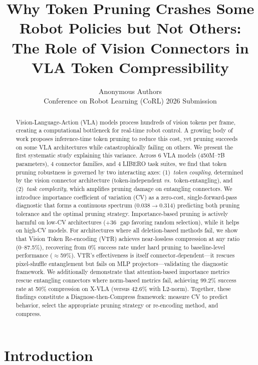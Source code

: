 \documentclass[10pt,letterpaper]{article}
\title{Why Token Pruning Crashes Some Robot Policies but Not Others:\\The Role of Vision Connectors in VLA Token Compressibility}
\author{
Anonymous Authors\\
Conference on Robot Learning (CoRL) 2026 Submission
}
\date{}
\newcommand{\pp}{\,\text{pp}}
\newcommand{\vs}{\textit{vs.}}
\begin{document}
\maketitle

\begin{abstract}
Vision-Language-Action (VLA) models process hundreds of vision tokens per frame, creating a computational bottleneck for real-time robot control. A growing body of work proposes inference-time token pruning to reduce this cost, yet pruning succeeds on some VLA architectures while catastrophically failing on others. We present the first systematic study explaining this variance. Across 6 VLA models (450M--7B parameters), 4 connector families, and 4 LIBERO task suites, we find that token pruning robustness is governed by two interacting axes: (1)~\emph{token coupling}, determined by the vision connector architecture (token-independent \vs\ token-entangling), and (2)~\emph{task complexity}, which amplifies pruning damage on entangling connectors. We introduce importance coefficient of variation (CV) as a zero-cost, single-forward-pass diagnostic that forms a continuous spectrum (0.038$\to$0.314) predicting both pruning tolerance and the optimal pruning strategy. Importance-based pruning is actively harmful on low-CV architectures ($+$36\pp\ gap favoring random selection), while it helps on high-CV models. For architectures where all deletion-based methods fail, we show that Vision Token Re-encoding (VTR) achieves near-lossless compression at any ratio (0--87.5\%), recovering from 0\% success rate under hard pruning to baseline-level performance ($\approx$59\%). VTR's effectiveness is itself connector-dependent---it rescues pixel-shuffle entanglement but fails on MLP projectors---validating the diagnostic framework. We additionally demonstrate that attention-based importance metrics rescue entangling connectors where norm-based metrics fail, achieving 99.2\% success rate at 50\% compression on X-VLA (versus 42.6\% with L2-norm). Together, these findings constitute a Diagnose-then-Compress framework: measure CV to predict behavior, select the appropriate pruning strategy or re-encoding method, and compress.
\end{abstract}

\section{Introduction}
\label{sec:intro}
\end{document}
